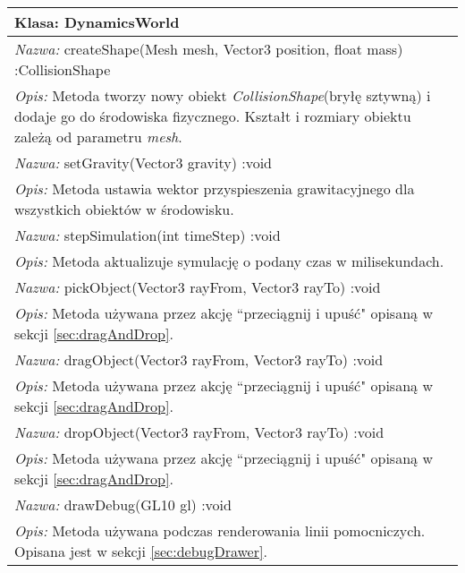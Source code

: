 \begin{tabular}{|p{\textwidth}|}
\hline
\textbf{Klasa: DynamicsWorld}\\ \hline
\emph{Nazwa: } createShape(Mesh mesh, Vector3 position, float mass)
:CollisionShape\\
\emph{Opis: } Metoda tworzy nowy obiekt \emph{CollisionShape}(bryłę sztywną) i
dodaje go do środowiska fizycznego. Kształt i rozmiary obiektu zależą od
parametru \emph{mesh}.\\
\hline
\emph{Nazwa: } setGravity(Vector3 gravity) :void\\
\emph{Opis: } Metoda ustawia wektor przyspieszenia grawitacyjnego dla wszystkich
obiektów w środowisku.\\
\hline
\emph{Nazwa: } stepSimulation(int timeStep) :void\\
\emph{Opis: } Metoda aktualizuje symulację o podany czas w milisekundach.\\
\hline
\emph{Nazwa: } pickObject(Vector3 rayFrom, Vector3 rayTo) :void\\
\emph{Opis: } Metoda używana przez akcję ``przeciągnij i upuść" opisaną w
sekcji \ref{sec:dragAndDrop}.\\
\hline
\emph{Nazwa: } dragObject(Vector3 rayFrom, Vector3 rayTo) :void\\
\emph{Opis: } Metoda używana przez akcję ``przeciągnij i upuść" opisaną w
sekcji \ref{sec:dragAndDrop}.\\
\hline
\emph{Nazwa: } dropObject(Vector3 rayFrom, Vector3 rayTo) :void\\
\emph{Opis: } Metoda używana przez akcję ``przeciągnij i upuść" opisaną w
sekcji \ref{sec:dragAndDrop}.\\
\hline
\emph{Nazwa: } drawDebug(GL10 gl) :void\\
\emph{Opis: } Metoda używana podczas renderowania linii pomocniczych. Opisana
jest w sekcji \ref{sec:debugDrawer}.\\
\hline
\end{tabular}